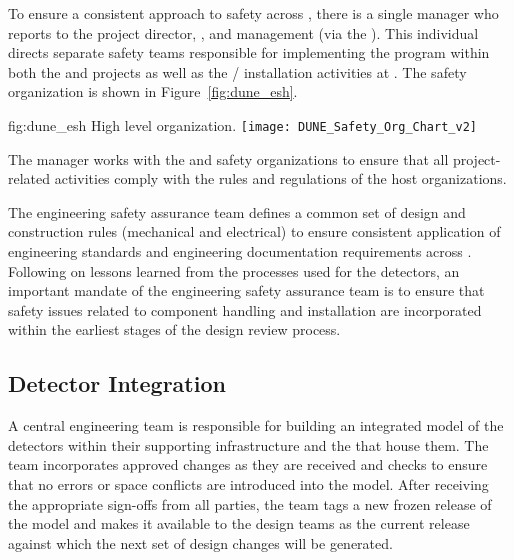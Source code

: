 To ensure a consistent approach to safety across ,
there is a single   manager who reports 
to the  project director, , and 
management (via the  ).  This individual
directs separate safety teams responsible for implementing the
  program within both the  
and  projects as well as the /
installation activities at . The safety organization 
is shown in Figure~\ref{fig:dune_esh}.

\begin{dunefigure}{fig:dune_esh}
  {High level   organization.}
  \texttt{[image: DUNE\_Safety\_Org\_Chart\_v2]}
\end{dunefigure}
The   manager works with the  
and  safety organizations to ensure that all project-related 
activities comply with the rules and regulations of the host 
organizations.  

The  engineering safety assurance team defines a common 
set of design and construction rules (mechanical and electrical) to 
ensure consistent application of engineering standards and engineering 
documentation requirements across .  
Following on lessons learned from the processes used for the 
 detectors, an important mandate of the engineering 
safety assurance team is to ensure that safety issues related to 
component handling and installation are incorporated within the 
earliest stages of the design review process.  

\subsection{%
Detector Integration}   
\label{sec:dune_engineering}


A central  engineering team is responsible for building 
an integrated model of the detectors within their supporting
infrastructure and the  that house them.  The  team incorporates approved changes as they 
are received and checks to ensure that no errors or space conflicts 
are introduced into the model.    After receiving the appropriate sign-offs from all 
parties, the  team tags a new frozen release of the model 
and makes it available to the design teams as the current release 
against which the next set of design changes will be generated.

